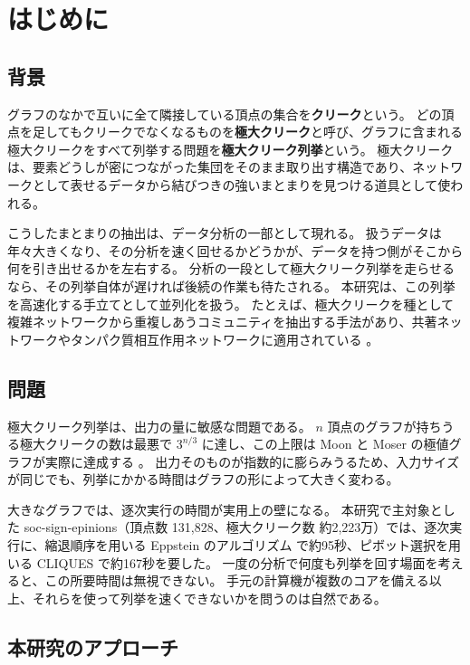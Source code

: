 \chapter{はじめに}
\label{ch:introduction}

\section{背景}
\label{sec:intro-background}

グラフのなかで互いに全て隣接している頂点の集合を\textbf{クリーク}という。
どの頂点を足してもクリークでなくなるものを\textbf{極大クリーク}と呼び、グラフに含まれる極大クリークをすべて列挙する問題を\textbf{極大クリーク列挙}という。
極大クリークは、要素どうしが密につながった集団をそのまま取り出す構造であり、ネットワークとして表せるデータから結びつきの強いまとまりを見つける道具として使われる。

こうしたまとまりの抽出は、データ分析の一部として現れる。
扱うデータは年々大きくなり、その分析を速く回せるかどうかが、データを持つ側がそこから何を引き出せるかを左右する。
分析の一段として極大クリーク列挙を走らせるなら、その列挙自体が遅ければ後続の作業も待たされる。
本研究は、この列挙を高速化する手立てとして並列化を扱う。
たとえば、極大クリークを種として複雑ネットワークから重複しあうコミュニティを抽出する手法があり、共著ネットワークやタンパク質相互作用ネットワークに適用されている \cite{palla2005}。

\section{問題}
\label{sec:intro-problem}

極大クリーク列挙は、出力の量に敏感な問題である。
$n$ 頂点のグラフが持ちうる極大クリークの数は最悪で $3^{n/3}$ に達し、この上限は Moon と Moser の極値グラフが実際に達成する \cite{moon1965}。
出力そのものが指数的に膨らみうるため、入力サイズが同じでも、列挙にかかる時間はグラフの形によって大きく変わる。

大きなグラフでは、逐次実行の時間が実用上の壁になる。
本研究で主対象とした soc-sign-epinions（頂点数 131{,}828、極大クリーク数 約2{,}223万）では、逐次実行に、縮退順序を用いる Eppstein のアルゴリズム \cite{eppstein2010,eppstein2013} で約95秒、ピボット選択を用いる CLIQUES \cite{tomita2006} で約167秒を要した。
一度の分析で何度も列挙を回す場面を考えると、この所要時間は無視できない。
手元の計算機が複数のコアを備える以上、それらを使って列挙を速くできないかを問うのは自然である。

\section{本研究のアプローチ}
\label{sec:intro-approach}

